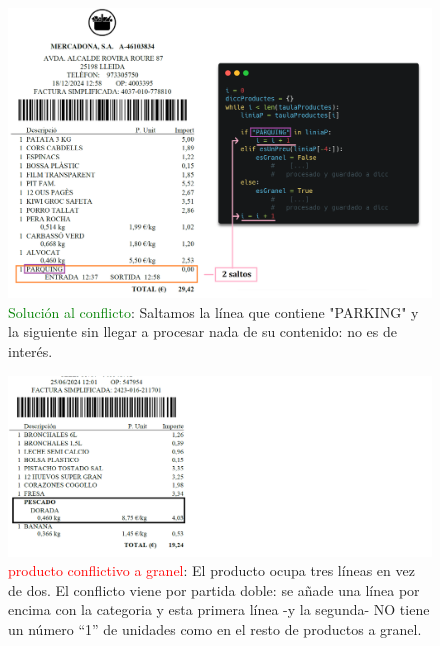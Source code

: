 \documentclass{beamer}
\begin{document}
	
	\begin{frame}	
		\begin{figure}
			\centering
			\includegraphics[width=.75\linewidth]{imgEspecifiques/ticketExtraccioQ}
			\caption{\textcolor{green}{Solución al conflicto}: Saltamos la línea que contiene "PARKING" y la siguiente sin llegar a procesar nada de su contenido: no es de interés.}
			\label{fig:ticketextraccionQ}
		\end{figure}
	\end{frame}
	
	
	\begin{frame}
		\begin{figure}
			\centering
			\includegraphics[width=1\linewidth]{imgEspecifiques/ticketExtraccioR}
			\caption{\textcolor{red}{producto conflictivo a granel}: El producto ocupa tres líneas en vez de dos. El conflicto viene por partida doble: se añade una línea por encima con la categoria y esta primera línea -y la segunda- NO tiene un número ``1'' de unidades como en el resto de productos a granel. }
			\label{fig:ticketextraccioR}
		\end{figure}
	\end{frame}
	
\end{document}
